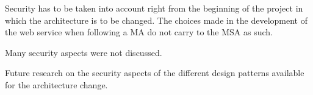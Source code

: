\begin{sloppypar}
    Security has to be taken into account right from the beginning of the 
    project in which the architecture is to be changed. The choices made in the 
    development of the web service when following a MA do not carry to the MSA 
    as such.
\end{sloppypar}
\begin{sloppypar}
    Many security aspects were not discussed.
\end{sloppypar}
\begin{sloppypar}
    Future research on the security aspects of the different design patterns 
    available for the architecture change.
\end{sloppypar}




